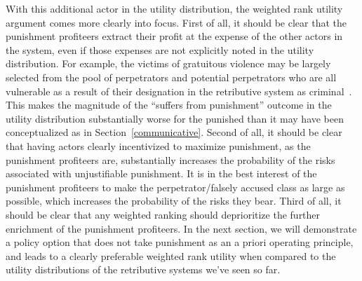 \documentclass{article}
\begin{document}
        With this additional actor in the utility distribution, the weighted rank utility argument comes more clearly into focus. First of all, it should be clear that the punishment profiteers extract their profit at the expense of the other actors in the system, even if those expenses are not explicitly noted in the utility distribution. For example, the victims of gratuitous violence may be largely selected from the pool of perpetrators and potential perpetrators who are all vulnerable as a result of their designation in the retributive system as criminal~\cite{criminalization-of-blackness}. This makes the magnitude of the ``suffers from punishment'' outcome in the utility distribution substantially worse for the punished than it may have been conceptualized as in Section~\ref{communicative}. Second of all, it should be clear that having actors clearly incentivized to maximize punishment, as the punishment profiteers are, substantially increases the probability of the risks associated with unjustifiable punishment. It is in the best interest of the punishment profiteers to make the perpetrator/falsely accused class as large as possible, which increases the probability of the risks they bear. Third of all, it should be clear that any weighted ranking should deprioritize the further enrichment of the punishment profiteers. In the next section, we will demonstrate a policy option that does not take punishment as an a priori operating principle, and leads to a clearly preferable weighted rank utility when compared to the utility distributions of the retributive systems we've seen so far.  

\end{document}
